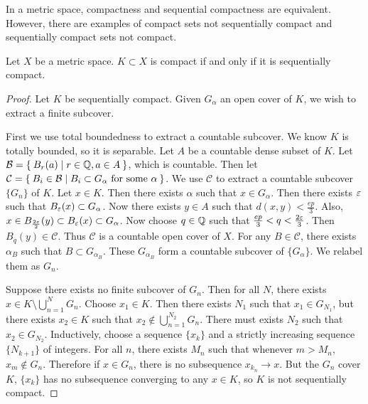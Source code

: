 \documentclass[10pt, twoside]{article}
\begin{document}
    In a metric space, compactness and sequential compactness are equivalent.
    However, there are examples of compact sets not sequentially compact and
    sequentially compact sets not compact.

    \begin{thm} Let $X$ be a metric space. $K \subset X$ is compact if and only
        if it is sequentially compact.  \begin{proof} Let $K$ be sequentially
            compact. Given $G_{\alpha}$ an open cover of $K$, we wish to
            extract a finite subcover. 
            
            First we use total boundedness to extract a countable subcover. We
            know $K$ is totally bounded, so it is separable. Let $A$ be a
            countable dense subset of $K$. Let $\mathcal{B} = \Set{B_r(a) | r
            \in \mathbb{Q}, a \in A}$, which is countable. Then let $\mathcal{C} =
            \Set{B_i \in \mathcal{B} | B_i \subset G_{\alpha} \text{ for some
            $\alpha$}}$. We use $\mathcal{C}$ to extract a countable subcover
            $\{G_n\}$ of $K$. Let $x \in K$. Then there exists $\alpha$ such
            that $x \in G_{\alpha}$. Then there exists $\varepsilon$ such that
            $B_{\varepsilon}(x) \subset G_{\alpha}$. Now there exists $y \in A$ such
            that $d(x,y) < \frac{ep}{3}$. Also, $x \in B_{\frac{2\varepsilon}{2}}(y)
            \subset B_{\varepsilon}(x) \subset G_{\alpha}$. Now choose $q \in \mathbb{Q}$ such
            that $\frac{ep}{3} < q < \frac{2\varepsilon}{3}$. Then $B_{q}(y) \in
            \mathcal{C}$. Thus $\mathcal{C}$ is a countable open cover of $X$.
            For any $B \in \mathcal{C}$, there exists $\alpha_B$ such that $B
            \subset G_{\alpha_B}$. These $G_{\alpha_B}$ form a countable
            subcover of $\{G_{\alpha}\}$. We relabel them as $G_n$.

            Suppose there exists no finite subcover of $G_n$. Then for all $N$,
            there exists $x \in K \setminus \bigcup_{n=1}^N G_n$. Choose $x_1
            \in K$. Then there exists $N_1$ such that $x_1 \in G_{N_1}$, but
            there exists $x_2 \in K$ such that $x_2 \notin \bigcup_{n=1}^{N_2}
            G_n$. There must exists $N_2$ such that $x_2 \in G_{N_2}$.
            Inductively, choose a sequence $\{x_k\}$ and a strictly increasing
            sequence $\{N_{k+1}\}$ of integers. For all $n$, there exists $M_n$
            such that whenever $m > M_n$, $x_m \notin G_n$. Therefore if $x \in
            G_n$, there is no subsequence $x_{k_n} \rightarrow x$. But the
            $G_n$ cover $K$, $\{x_k\}$ has no subsequence converging to any $x
            \in K$, so $K$ is not sequentially compact.


\end{proof}
\end{thm}
\end{document}
